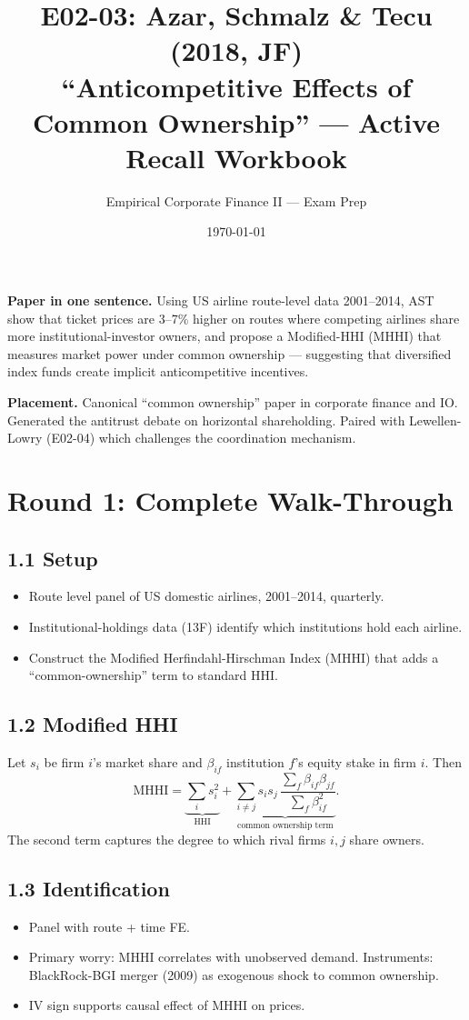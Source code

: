 \documentclass[11pt]{article}
\title{E02-03: Azar, Schmalz \& Tecu (2018, JF) \\
\large ``Anticompetitive Effects of Common Ownership'' --- Active Recall Workbook}
\author{Empirical Corporate Finance II --- Exam Prep}
\date{\today}
\begin{document}
\maketitle

\begin{keybox}
\textbf{Paper in one sentence.} Using US airline route-level data 2001--2014, AST show that ticket prices are 3--7\% higher on routes where competing airlines share more institutional-investor owners, and propose a Modified-HHI (MHHI) that measures market power under common ownership --- suggesting that diversified index funds create implicit anticompetitive incentives.

\textbf{Placement.} Canonical ``common ownership'' paper in corporate finance and IO. Generated the antitrust debate on horizontal shareholding. Paired with Lewellen-Lowry (E02-04) which challenges the coordination mechanism.
\end{keybox}

\section*{Round 1: Complete Walk-Through}

\subsection*{1.1 Setup}
\begin{itemize}
\item Route level panel of US domestic airlines, 2001--2014, quarterly.
\item Institutional-holdings data (13F) identify which institutions hold each airline.
\item Construct the Modified Herfindahl-Hirschman Index (MHHI) that adds a ``common-ownership'' term to standard HHI.
\end{itemize}

\subsection*{1.2 Modified HHI}
Let $s_i$ be firm $i$'s market share and $\beta_{if}$ institution $f$'s equity stake in firm $i$. Then
\[
\text{MHHI} = \underbrace{\sum_i s_i^2}_{\text{HHI}} + \underbrace{\sum_{i\ne j} s_i s_j \,\frac{\sum_f \beta_{if}\beta_{jf}}{\sum_f \beta_{if}^2}}_{\text{common ownership term}}.
\]
The second term captures the degree to which rival firms $i,j$ share owners.

\subsection*{1.3 Identification}
\begin{itemize}
\item Panel with route + time FE.
\item Primary worry: MHHI correlates with unobserved demand. Instruments: BlackRock-BGI merger (2009) as exogenous shock to common ownership.
\item IV sign supports causal effect of MHHI on prices.
\end{itemize}
\end{document}
